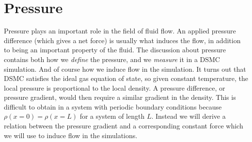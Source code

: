 \section{Pressure}
\label{sec:dsmc_pressure}
Pressure plays an important role in the field of fluid flow. An applied pressure difference (which gives a net force) is usually what induces the flow, in addition to being an important property of the fluid. The discussion about pressure contains both how we \textit{define} the pressure, and we \textit{measure} it in a DSMC simulation. And of course how we induce flow in the simulation. It turns out that DSMC satisfies the ideal gas equation of state, so given constant temperature, the local pressure is proportional to the local density. A pressure difference, or pressure gradient, would then require a similar gradient in the density. This is difficult to obtain in a system with periodic boundary conditions because $\rho(x=0) = \rho(x=L)$ for a system of length $L$. Instead we will derive a relation between the pressure gradient and a corresponding constant force which we will use to induce flow in the simulations. 
